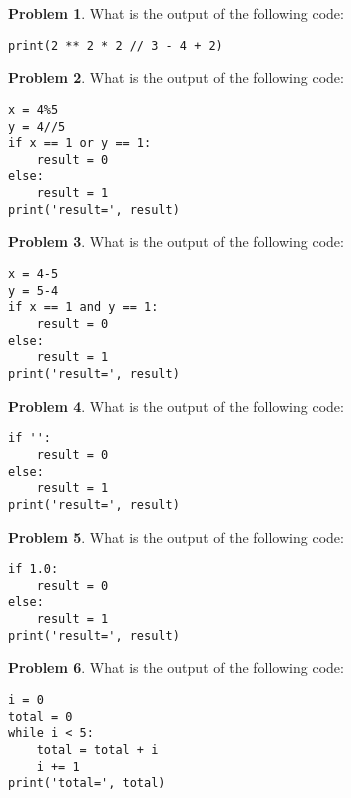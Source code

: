 \documentclass[10pt]{article}
\theoremstyle{definition}
\newtheorem{problem}{Problem}
\begin{document}
\begin{problem}
    What is the output of the following code:
\end{problem}
\begin{lstlisting}
print(2 ** 2 * 2 // 3 - 4 + 2)
\end{lstlisting}
\vspace{0.1in}

\begin{problem}
    What is the output of the following code:
\end{problem}
\begin{lstlisting}
x = 4%5
y = 4//5
if x == 1 or y == 1:
    result = 0
else:
    result = 1
print('result=', result)
\end{lstlisting}
\vspace{0.1in}

\newpage
\begin{problem}
    What is the output of the following code:
\end{problem}
\begin{lstlisting}
x = 4-5
y = 5-4
if x == 1 and y == 1:
    result = 0
else:
    result = 1
print('result=', result)
\end{lstlisting}
\vspace{0.1in}

\begin{problem}
    What is the output of the following code:
\end{problem}
\begin{lstlisting}
if '':
    result = 0
else:
    result = 1
print('result=', result)
\end{lstlisting}
\vspace{0.1in}

\begin{problem}
    What is the output of the following code:
\end{problem}
\begin{lstlisting}
if 1.0:
    result = 0
else:
    result = 1
print('result=', result)
\end{lstlisting}
\vspace{0.1in}



\begin{problem}
    What is the output of the following code:
\end{problem}
\begin{lstlisting}
i = 0
total = 0
while i < 5:
    total = total + i
    i += 1
print('total=', total)
\end{lstlisting}
\vspace{0.1in}
\end{document}
